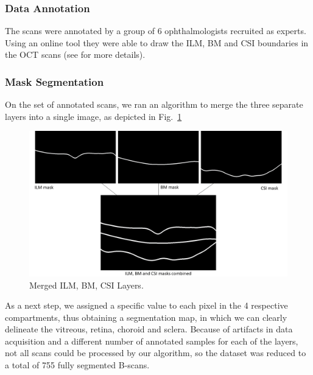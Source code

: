 \documentclass[12pt,a4paper]{scrartcl}
\begin{document}
\subsubsection{Data Annotation}

The scans were annotated by a group of 6 ophthalmologists recruited as experts. Using an online tool they were able to draw the ILM, BM and CSI boundaries in the OCT scans (see \cite{Ronchetti2019} for more details).

\subsubsection{Mask Segmentation}
On the set of annotated scans, we ran an algorithm to merge the three separate layers into a single image, as depicted in Fig.~\ref{fig:merged}

\begin{figure}[H]
    \centering
    \includegraphics[width=1\textwidth]{./images/ILM_BM_CSI_merged.png}
    \caption{Merged ILM, BM, CSI Layers.}
    \label{fig:merged}
\end{figure}

As a next step, we assigned a specific value to each pixel in the 4 respective compartments, thus obtaining a segmentation map, in which we can clearly delineate the vitreous, retina, choroid and sclera. Because of artifacts in data acquisition and a different number of annotated samples for each of the layers, not all scans could be processed by our algorithm, so the dataset was reduced to a total of 755 fully segmented B-scans.
\end{document}
